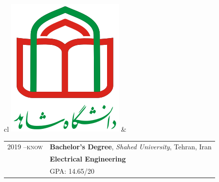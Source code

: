 
\begin{tabular}{cl}
	\includegraphics[scale=0.15]{graphics/Shahed_logo}        &
	\begin{tabular}{rl}
		\textsc{2019 --know} & \textbf{Bachelor's Degree},  \emph{Shahed University}, Tehran, Iran                                          \\
		                     & \textbf{Electrical Engineering}                                                                                     \\
		                     & \textsc{GPA}: 14.65/20                                                                                                      \\
	\end{tabular}
	\\
\end{tabular}
\\

